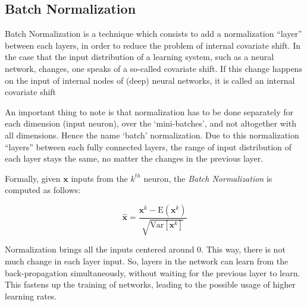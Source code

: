 \subsection{Batch Normalization}
Batch Normalization \cite{ioffe2015batch} is a technique which consists to add a normalization “layer” between each layers, in order to reduce the problem of internal covariate shift. In the case that the input distribution of a learning system, such as a neural network, changes, one speaks of a so-called covariate shift. If this change happens on the input of internal nodes of (deep) neural networks, it is called an internal covariate shift

An important thing to note is that normalization has to be done separately for each dimension (input neuron), over the ‘mini-batches’, and not altogether with all dimensions. Hence the name ‘batch’ normalization.
Due to this normalization “layers” between each fully connected layers, the range of input distribution of each layer stays the same, no matter the changes in the previous layer. 

Formally, given $\mathbf{x}$ inputs from the $k^{th}$ neuron, the \textit{Batch Normalization} is computed as follows:

\begin{equation}
	\hat{\mathbf{x}} = \frac{\mathbf{x}^k-\text{E}(\mathbf{x}^k)}{\sqrt{\text{Var}[\mathbf{x}^k]}}
\end{equation}


Normalization brings all the inputs centered around 0. This way, there is not much change in each layer input. So, layers in the network can learn from the back-propagation simultaneously, without waiting for the previous layer to learn. This fastens up the training of networks, leading to the possible usage of higher learning rates.





